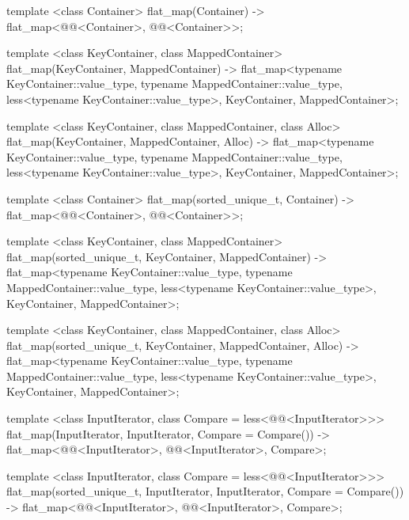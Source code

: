 \begin{addedblock}
\begin{codeblock}
{  template <class Container>
    flat_map(Container)
      -> flat_map<@@<Container>, @@<Container>>;

  template <class KeyContainer, class MappedContainer>
    flat_map(KeyContainer, MappedContainer)
      -> flat_map<typename KeyContainer::value_type,
                  typename MappedContainer::value_type,
                  less<typename KeyContainer::value_type>,
                  KeyContainer, MappedContainer>;

  template <class KeyContainer, class MappedContainer, class Alloc>
    flat_map(KeyContainer, MappedContainer, Alloc)
      -> flat_map<typename KeyContainer::value_type,
                  typename MappedContainer::value_type,
                  less<typename KeyContainer::value_type>,
                  KeyContainer, MappedContainer>;

  template <class Container>
    flat_map(sorted_unique_t, Container)
      -> flat_map<@@<Container>, @@<Container>>;

  template <class KeyContainer, class MappedContainer>
    flat_map(sorted_unique_t, KeyContainer, MappedContainer)
      -> flat_map<typename KeyContainer::value_type,
                  typename MappedContainer::value_type,
                  less<typename KeyContainer::value_type>,
                  KeyContainer, MappedContainer>;

  template <class KeyContainer, class MappedContainer, class Alloc>
    flat_map(sorted_unique_t, KeyContainer, MappedContainer, Alloc)
      -> flat_map<typename KeyContainer::value_type,
                  typename MappedContainer::value_type,
                  less<typename KeyContainer::value_type>,
                  KeyContainer, MappedContainer>;

  template <class InputIterator, class Compare = less<@@<InputIterator>>>
    flat_map(InputIterator, InputIterator, Compare = Compare())
      -> flat_map<@@<InputIterator>, @@<InputIterator>, Compare>;

  template <class InputIterator, class Compare = less<@@<InputIterator>>>
    flat_map(sorted_unique_t, InputIterator, InputIterator, Compare = Compare())
      -> flat_map<@@<InputIterator>, @@<InputIterator>, Compare>;

}
\end{codeblock}
\end{addedblock}
